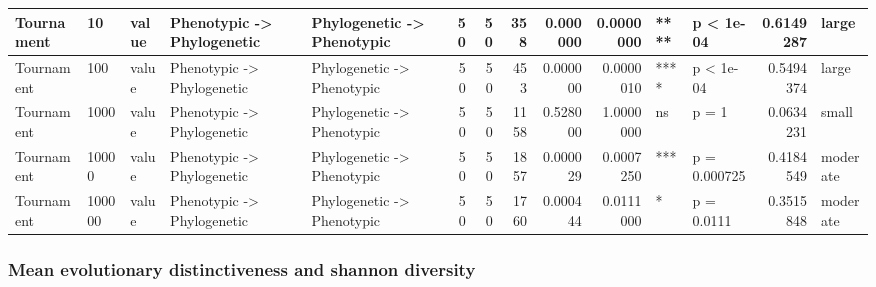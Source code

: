 \documentclass[]{book}
\begin{document}
\begin{table}
\begin{tabular}[t]{l|l|l|l|l|r|r|r|r|r|l|l|r|l}
\hline
Tournament & 10 & value & Phenotypic
    ->
Phylogenetic & Phylogenetic
    ->
Phenotypic & 50 & 50 & 358 & 0.000000 & 0.0000000 & **** & p < 1e-04 & 0.6149287 & large\\
\hline
Tournament & 100 & value & Phenotypic
    ->
Phylogenetic & Phylogenetic
    ->
Phenotypic & 50 & 50 & 453 & 0.000000 & 0.0000010 & **** & p < 1e-04 & 0.5494374 & large\\
\hline
Tournament & 1000 & value & Phenotypic
    ->
Phylogenetic & Phylogenetic
    ->
Phenotypic & 50 & 50 & 1158 & 0.528000 & 1.0000000 & ns & p = 1 & 0.0634231 & small\\
\hline
Tournament & 10000 & value & Phenotypic
    ->
Phylogenetic & Phylogenetic
    ->
Phenotypic & 50 & 50 & 1857 & 0.000029 & 0.0007250 & *** & p = 0.000725 & 0.4184549 & moderate\\
\hline
Tournament & 100000 & value & Phenotypic
    ->
Phylogenetic & Phylogenetic
    ->
Phenotypic & 50 & 50 & 1760 & 0.000444 & 0.0111000 & * & p = 0.0111 & 0.3515848 & moderate\\
\hline
\end{tabular}
\end{table}

\hypertarget{mean-evolutionary-distinctiveness-and-shannon-diversity}{%
\subsubsection{Mean evolutionary distinctiveness and shannon diversity}\label{mean-evolutionary-distinctiveness-and-shannon-diversity}}
\end{document}
